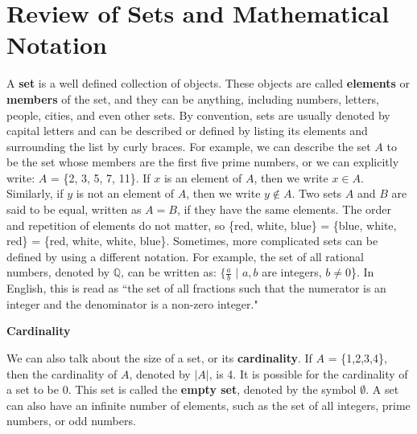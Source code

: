 \documentclass[11pt,fleqn]{article}
\def\title{Note \the\lecturenumber}
\begin{document}
\maketitle


\iffalse
\documentclass[11pt,fleqn]{article}
\usepackage{latexsym,epsf,amsmath,amsfonts,graphicx,url}

\title{Note 22}

\newcommand{\F}{\mathbb{F}}
\newcommand{\Z}{\mathbb{Z}}
\newcommand{\Q}{\mathbb{Q}}
\newcommand{\R}{\mathbb{R}}
\newcommand{\C}{\mathbb{C}}

\begin{document}

\maketitle
\fi

\section*{Review of Sets and Mathematical Notation}

A \textbf{set} is a well defined collection of objects.  These
objects are called \textbf{elements} or \textbf{members} of the set, and they can be anything, including numbers,
letters, people, cities, and even other sets.  By convention, sets are usually denoted by capital letters and can
be described or defined by listing its elements and surrounding the list by curly braces. For example, we can describe
the set $A$ to be the set whose members are the first five prime numbers, or we can explicitly write: $A$ = \{2, 3, 5, 7, 11\}.
If $x$ is an element of $A$, then we write $x \in A$. Similarly, if $y$ is not an element of $A$, then we write $y \not\in A$.
Two sets $A$ and $B$ are said to be equal, written as $A = B$, if they have the same elements. The order and repetition of
elements do not matter, so \{red, white, blue\} = \{blue, white, red\} = \{red, white, white, blue\}. Sometimes, more complicated
sets can be defined by using a different notation. For example, the set of all rational numbers, denoted by $\mathbb{Q}$, can be
written as: $\{\frac{a}{b}$ $|$ $a,b$ are integers, $b \not= 0$\}. In English, this is read as ``the set of all fractions such that
the numerator is an integer and the denominator is a non-zero integer."

\textbf{Cardinality}

We can also talk about the size of a set, or its \textbf{cardinality}. If $A$ = \{1,2,3,4\}, then the cardinality of $A$,
denoted by $|A|$, is 4. It is possible for the cardinality of a set to be 0. This set is called the \textbf{empty set}, denoted
by the symbol $\emptyset$. A set can also have an infinite number of elements, such as the set of all integers, prime numbers, or
odd numbers.


\end{document}
\end{document}
